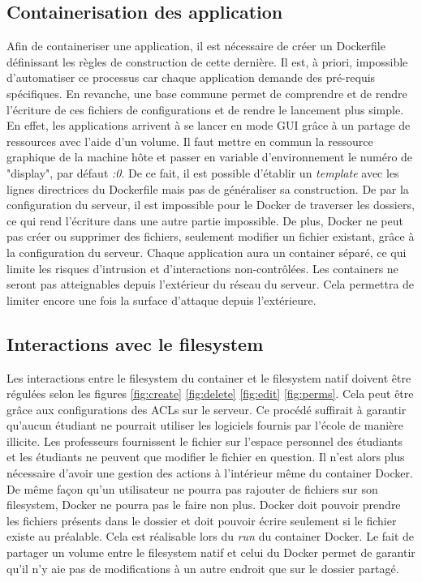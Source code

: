 \subsection{Containerisation des application}
Afin de containeriser une application, il est nécessaire de créer un Dockerfile définissant les règles de construction de cette dernière.
Il est, à priori, impossible d'automatiser ce processus car chaque application demande des pré-requis spécifiques.
En revanche, une base commune permet de comprendre et de rendre l'écriture de ces fichiers de configurations et de rendre le lancement plus simple.
En effet, les applications arrivent à se lancer en mode GUI grâce à un partage de ressources avec l'aide d'un volume.
Il faut mettre en commun la ressource graphique de la machine hôte et passer en variable d'environnement le numéro de "display", par défaut \textit{:0}.
De ce fait, il est possible d'établir un \textit{template} avec les lignes directrices du Dockerfile mais pas de généraliser sa construction.
De par la configuration du serveur, il est impossible pour le Docker de traverser les dossiers, ce qui rend l'écriture dans une autre partie impossible.
De plus, Docker ne peut pas créer ou supprimer des fichiers, seulement modifier un fichier existant, grâce à la configuration du serveur.
Chaque application aura un container séparé, ce qui limite les risques d'intrusion et d'interactions non-contrôlées.
Les containers ne seront pas atteignables depuis l'extérieur du réseau du serveur.
Cela permettra de limiter encore une fois la surface d'attaque depuis l'extérieure.

\subsection{Interactions avec le filesystem}
Les interactions entre le \gls{filesystem} du container et le \gls{filesystem} natif doivent être régulées selon les figures \ref{fig:create} \ref{fig:delete} \ref{fig:edit} \ref{fig:perms}.
Cela peut être grâce aux configurations des ACLs sur le serveur.
Ce procédé suffirait à garantir qu'aucun étudiant ne pourrait utiliser les logiciels fournis par l'école de manière illicite.
Les professeurs fournissent le fichier sur l'espace personnel des étudiants et les étudiants ne peuvent que modifier le fichier en question.
Il n'est alors plus nécessaire d'avoir une gestion des actions à l'intérieur même du container Docker.
De même façon qu'un utilisateur ne pourra pas rajouter de fichiers sur son \gls{filesystem}, Docker ne pourra pas le faire non plus.
Docker doit pouvoir prendre les fichiers présents dans le dossier et doit pouvoir écrire seulement si le fichier existe au préalable.
Cela est réalisable lors du \textit{run} du container Docker. 
Le fait de partager un volume entre le \gls{filesystem} natif et celui du Docker permet de garantir qu'il n'y aie pas de modifications à un autre endroit que sur le dossier partagé.

